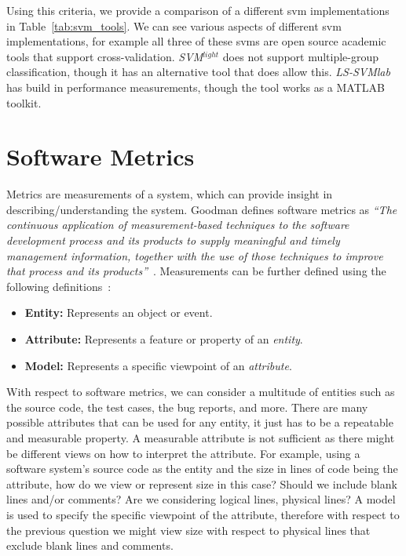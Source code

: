 Using this criteria, we provide a comparison of a different \gls{svm} implementations in Table~\ref{tab:svm_tools}. We can see various aspects of different \gls{svm} implementations, for example all three of these \gls{svm}s are open source academic tools that support cross-validation. \emph{SVM$^{light}$} does not support multiple-group classification, though it has an alternative tool that does allow this. \emph{LS-SVMlab} has build in performance measurements, though the tool works as a MATLAB toolkit.


\section{Software Metrics}
\label{sec:background_metrics}
Metrics are measurements of a system, which can provide insight in describing/understanding the system. Goodman defines software metrics as \emph{``The continuous application of measurement-based techniques to the software development process and its products to supply meaningful and timely management information, together with the use of those techniques to improve that process and its products''}~\cite{Goo93}. Measurements can be further defined using the following definitions~\cite{Fen94}:

\begin{itemize}
  \item \textbf{Entity:} Represents an object or event.
  \item \textbf{Attribute:} Represents a feature or property of an \emph{entity}.
  \item \textbf{Model:} Represents a specific viewpoint of an \emph{attribute}.
\end{itemize}

With respect to software metrics, we can consider a multitude of entities such as the source code, the test cases, the bug reports, and more. There are many possible attributes that can be used for any entity, it just has to be a repeatable and measurable property. A measurable attribute is not sufficient as there might be different views on how to interpret the attribute. For example, using a software system's source code as the entity and the size in lines of code being the attribute, how do we view or represent size in this case? Should we include blank lines and/or comments? Are we considering logical lines, physical lines? A model is used to specify the specific viewpoint of the attribute, therefore with respect to the previous question we might view size with respect to physical lines that exclude blank lines and comments.

